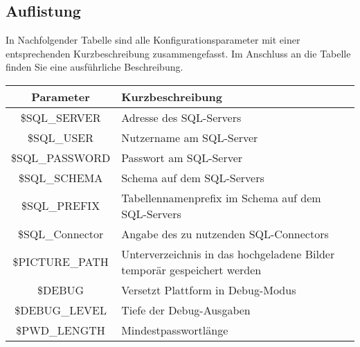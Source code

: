 \subsection{Auflistung}
In Nachfolgender Tabelle sind alle Konfigurationsparameter mit einer entsprechenden Kurzbeschreibung zusammengefasst. Im Anschluss an die Tabelle finden Sie eine ausführliche Beschreibung.
\begin{longtable}[H]{|c|p{8cm}|}
	\hline
	\textbf{Parameter}   & \textbf{Kurzbeschreibung}                                                                                                     \\ \hline
	\$SQL\_SERVER             & Adresse des SQL-Servers                                                                                                     \\ \hline	
	\$SQL\_USER               & Nutzername am SQL-Server                                                                                                     \\ \hline	
	\$SQL\_PASSWORD           & Passwort am SQL-Server                                                                                                     \\ \hline	
	\$SQL\_SCHEMA             & Schema auf dem SQL-Servers                                                                                                     \\ \hline	
	\$SQL\_PREFIX             & Tabellennamenprefix im Schema auf dem SQL-Servers                                                                                                     \\ \hline	
	\$SQL\_Connector          & Angabe des zu nutzenden SQL-Connectors                                                                                                     \\ \hline	
	\$PICTURE\_PATH           & Unterverzeichnis in das hochgeladene Bilder temporär gespeichert werden                                                                                                   \\ \hline	
	\$DEBUG                   & Versetzt Plattform in Debug-Modus                                                                                                     \\ \hline	
	\$DEBUG\_LEVEL            & Tiefe der Debug-Ausgaben                                                                                                     \\ \hline	
	\$PWD\_LENGTH             & Mindestpasswortlänge                                                                                                     \\ \hline	

\end{longtable}
